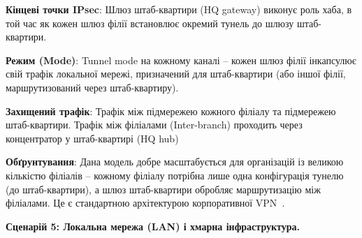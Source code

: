 \textbf{Кінцеві точки IPsec}: Шлюз штаб-квартири (HQ gateway) виконує роль хаба, в той час як кожен шлюз філії 
встановлює окремий тунель до шлюзу штаб-квартири.

\textbf{Режим (Mode)}: Tunnel mode на кожному каналі -- кожен шлюз філії інкапсулює свій трафік локальної мережі, 
призначений для штаб-квартири (або іншої філії, маршрутизований через штаб-квартиру).

\textbf{Захищений трафік}: Трафік між підмережею кожного філіалу та підмережею штаб-квартири. Трафік між 
філіалами (Inter-branch) проходить через концентратор у штаб-квартирі (HQ hub)

\textbf{Обґрунтування}: Дана модель добре масштабується для організацій із великою кількістю філіалів -- кожному 
філіалу потрібна лише одна конфігурація тунелю (до штаб-квартири), а шлюз штаб-квартири обробляє маршрутизацію 
між філіалами. Це є стандартною архітектурою корпоративної VPN~\cite{nist_sp800_77r1}.

\bigskip
\noindent\textbf{Сценарій 5: Локальна мережа (LAN) і хмарна інфраструктура.}

